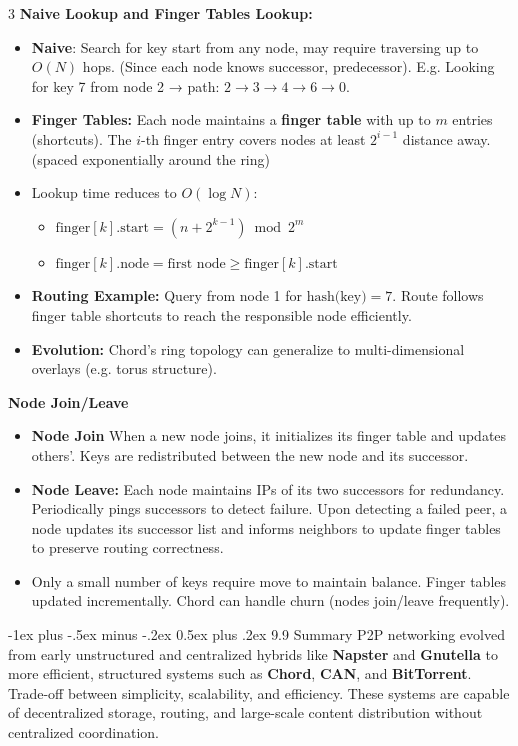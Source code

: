 \documentclass[a4paper, 9pt, landscape]{article}
\makeatletter
\renewcommand{\subsection}{\@startsection{subsubsection}{3}{0mm}%
                                {-1ex plus -.5ex minus -.2ex}%
                                {0.5ex plus .2ex}%
                                {\normalfont\small\bfseries}}
\makeatother
\begin{document}
\begin{multicols*}{3}
\textbf{Naive Lookup and Finger Tables Lookup:}
\begin{itemize}
    \item \textbf{Naive}: Search for key start from any node, may require traversing up to $O(N)$ hops. (Since each node knows successor, predecessor). E.g. Looking for key 7 from node 2 → path: $2 \rightarrow 3 \rightarrow 4 \rightarrow 6 \rightarrow 0$.
    \item \textbf{Finger Tables:} Each node maintains a \textbf{finger table} with up to $m$ entries (shortcuts). The $i$-th finger entry covers nodes at least $2^{i-1}$ distance away. (spaced exponentially around the ring)
    \item Lookup time reduces to $O(\log N)$:
    \begin{itemize}
\item $\text{finger}[k].\text{start} = (n + 2^{k-1}) \bmod 2^m$
\item $ \text{finger}[k].\text{node} = \text{first node} \geq \text{finger}[k].\text{start}$
	\end{itemize}
    \item \textbf{Routing Example:} Query from node 1 for $\text{hash(key)} = 7$. Route follows finger table shortcuts to reach the responsible node efficiently.
    \item \textbf{Evolution:} Chord’s ring topology can generalize to multi-dimensional overlays (e.g. torus structure).
\end{itemize}

\textbf{Node Join/Leave}
\begin{itemize}
    \item \textbf{Node Join} When a new node joins, it initializes its finger table and updates others’. Keys are redistributed between the new node and its successor.
	\item \textbf{Node Leave:} Each node maintains IPs of its two successors for redundancy. Periodically pings successors to detect failure. Upon detecting a failed peer, a node updates its successor list and informs neighbors to update finger tables to preserve routing correctness.
	\item Only a small number of keys require move to maintain balance. Finger tables updated incrementally. Chord can handle churn (nodes join/leave frequently).
\end{itemize}



\subsection{9.9 Summary}
P2P networking evolved from early unstructured and centralized hybrids like \textbf{Napster} and \textbf{Gnutella} to more efficient, structured systems such as \textbf{Chord}, \textbf{CAN}, and \textbf{BitTorrent}. Trade-off between simplicity, scalability, and efficiency. These systems are capable of decentralized storage, routing, and large-scale content distribution without centralized coordination.







\end{multicols*}
\end{document}
